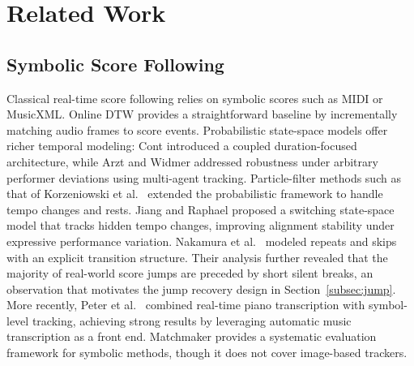 \section{Related Work}\label{sec:related}

\subsection{Symbolic Score Following}
Classical real-time score following relies on symbolic scores such as MIDI or MusicXML. Online DTW \cite{dixon2005line} provides a straightforward baseline by incrementally matching audio frames to score events. Probabilistic state-space models offer richer temporal modeling: Cont \cite{cont2010coupled} introduced a coupled duration-focused architecture, while Arzt and Widmer \cite{arzt2010towards} addressed robustness under arbitrary performer deviations using multi-agent tracking. Particle-filter methods such as that of Korzeniowski et al.\ \cite{korzeniowski2013tracking} extended the probabilistic framework to handle tempo changes and rests. Jiang and Raphael \cite{jiang2020score} proposed a switching state-space model that tracks hidden tempo changes, improving alignment stability under expressive performance variation. Nakamura et al.\ \cite{nakamura2016real} modeled repeats and skips with an explicit transition structure. Their analysis further revealed that the majority of real-world score jumps are preceded by short silent breaks, an observation that motivates the jump recovery design in Section~\ref{subsec:jump}. More recently, Peter et al.\ \cite{peter2025pairing} combined real-time piano transcription with symbol-level tracking, achieving strong results by leveraging automatic music transcription as a front end. Matchmaker \cite{park2025matchmaker} provides a systematic evaluation framework for symbolic methods, though it does not cover image-based trackers.

